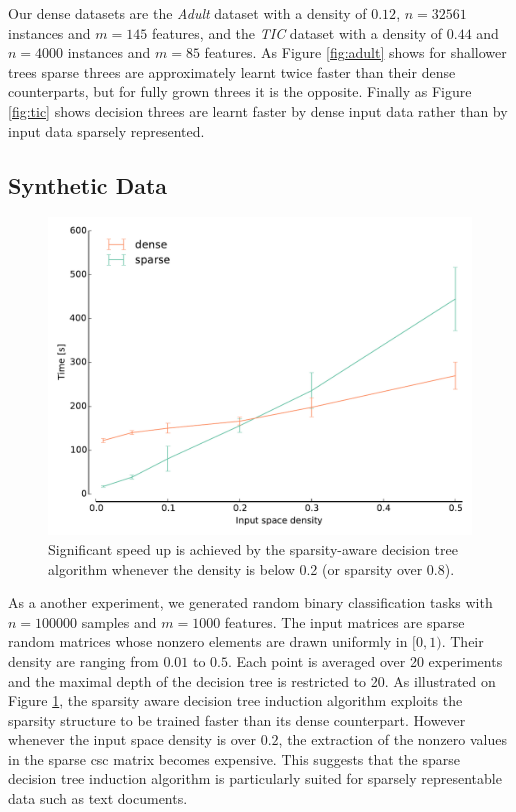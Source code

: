 Our dense datasets are the \emph{Adult} dataset\cite{Bache+Lichman:2013} with a density of $0.12$, $n=32561$ instances and  $m=145$ features, and the \emph{TIC} dataset\cite{Bache+Lichman:2013} with a density of $0.44$ and $n=4000$ instances and $m=85$ features. As Figure \ref{fig:adult} shows for shallower trees sparse threes are approximately learnt twice faster than their dense counterparts, but for fully grown threes it is the opposite. Finally as Figure \ref{fig:tic} shows decision threes are learnt faster by dense input data rather than by input data sparsely represented. 



\subsection{Synthetic Data}

\begin{figure}[h]
\centering
\includegraphics[scale=0.45]{images/density.pdf}
\caption{Significant speed up is achieved by the sparsity-aware decision tree
         algorithm whenever the density is below 0.2 (or sparsity over 0.8).}
\label{fig:density}
\end{figure}

As a another experiment, we generated random binary classification tasks with
$n=100000$ samples and $m=1000$ features. The input matrices are sparse random
matrices whose nonzero elements are drawn uniformly in $[0, 1)$. Their density
are ranging from $0.01$ to $0.5$. Each point is averaged over 20 experiments
and the maximal depth of the decision tree is restricted to 20. As illustrated
on Figure \ref{fig:density}, the sparsity aware decision tree induction
algorithm exploits the sparsity structure to be trained faster than its dense
counterpart. However whenever the input space density is over $0.2$, the
extraction of the nonzero values in the sparse csc matrix becomes expensive.
This suggests that the sparse decision tree induction algorithm is particularly
suited for sparsely representable data such as text documents.






